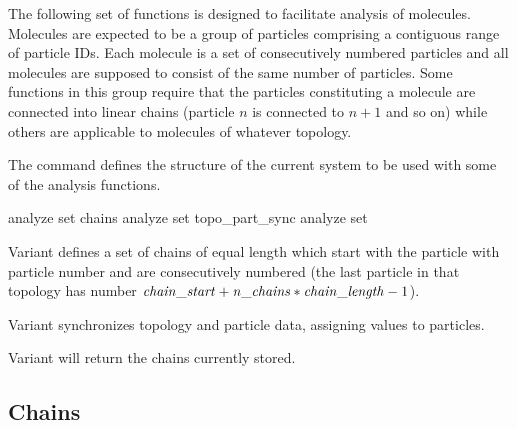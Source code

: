 The following set of functions is designed to facilitate analysis of molecules. Molecules are expected to be a group of particles
comprising a contiguous range of particle IDs. Each molecule
is a set of consecutively numbered particles and all molecules
are supposed to consist of the same number of particles.
Some functions in this group require that the particles constituting
a molecule are connected into linear chains (particle $n$ is connected
to $n+1$ and so on) while others are applicable to molecules
of whatever topology.

The  command defines the structure of the current
system to be used with some of the analysis functions.

\begin{essyntax}
   analyze set chains 
   analyze set topo\_part\_sync
   analyze set
\end{essyntax}

Variant  defines a set of  chains of equal
length  which start with the particle with particle
number  and are consecutively numbered (\ie the last
particle in that topology has number $\mathrm{\mathit{chain\_start}} +
\mathrm{\mathit{n\_chains}}*\mathrm{\mathit{chain\_length}} - 1$). 

Variant  synchronizes topology and particle data, assigning  values to particles.

Variant  will return the chains currently stored.



\subsection{Chains}

